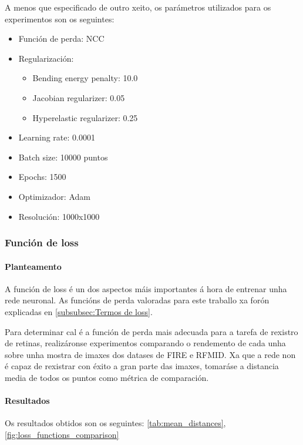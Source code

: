 A menos que especificado de outro xeito, os parámetros utilizados para os experimentos son os seguintes:
\begin{itemize}
    \item Función de perda: NCC
    \item Regularización:
    \begin{itemize}
         \item Bending energy penalty: 10.0
         \item Jacobian regularizer: 0.05
         \item Hyperelastic regularizer: 0.25
    \end{itemize}
    \item Learning rate: 0.0001
    \item Batch size: 10000 puntos
    \item Epochs: 1500
    \item Optimizador: Adam
    \item Resolución: 1000x1000
\end{itemize}


\subsubsection{Función de loss}
\label{subsubsec:Función de loss}

\paragraph{Planteamento}
\label{par:Planteamento-loss}

A función de loss é un dos aspectos máis importantes á hora de entrenar unha rede neuronal.
As funcións de perda valoradas para este traballo xa forón explicadas en \ref{subsubsec:Termos de loss}.

Para determinar cal é a función de perda mais adecuada para a tarefa de rexistro de retinas, realizáronse experimentos comparando o rendemento de cada unha sobre unha mostra de imaxes dos datases de FIRE e RFMID.
Xa que a rede non é capaz de rexistrar con éxito a gran parte das imaxes, tomaráse a distancia media de todos os puntos como métrica de comparación.

\paragraph{Resultados}
\label{par:Resultados-loss}

Os resultados obtidos son os seguintes: \ref{tab:mean_distances}, \ref{fig:loss_functions_comparison}

